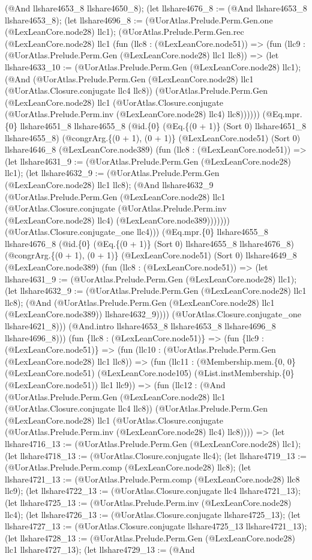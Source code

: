 \documentclass[11pt]{article}
\begin{document}
(@And llshare4653\_8 llshare4650\_8); (let llshare4676\_8 := (@And llshare4653\_8 llshare4653\_8); (let llshare4696\_8 := (@UorAtlas.Prelude.Perm.Gen.one (@LexLeanCore.node28) llc1); (@UorAtlas.Prelude.Perm.Gen.rec (@LexLeanCore.node28) llc1 (fun (llc8 : (@LexLeanCore.node51)) => (fun (llc9 : (@UorAtlas.Prelude.Perm.Gen (@LexLeanCore.node28) llc1 llc8)) => (let llshare4633\_10 := (@UorAtlas.Prelude.Perm.Gen (@LexLeanCore.node28) llc1); (@And (@UorAtlas.Prelude.Perm.Gen (@LexLeanCore.node28) llc1 (@UorAtlas.Closure.conjugate llc4 llc8)) (@UorAtlas.Prelude.Perm.Gen (@LexLeanCore.node28) llc1 (@UorAtlas.Closure.conjugate (@UorAtlas.Prelude.Perm.inv (@LexLeanCore.node28) llc4) llc8)))))) (@Eq.mpr.\{0\} llshare4651\_8 llshare4655\_8 (@id.\{0\} (@Eq.\{(0 + 1)\} (Sort 0) llshare4651\_8 llshare4655\_8) (@congrArg.\{(0 + 1), (0 + 1)\} (@LexLeanCore.node51) (Sort 0) llshare4646\_8 (@LexLeanCore.node389) (fun (llc8 : (@LexLeanCore.node51)) => (let llshare4631\_9 := (@UorAtlas.Prelude.Perm.Gen (@LexLeanCore.node28) llc1); (let llshare4632\_9 := (@UorAtlas.Prelude.Perm.Gen (@LexLeanCore.node28) llc1 llc8); (@And llshare4632\_9 (@UorAtlas.Prelude.Perm.Gen (@LexLeanCore.node28) llc1 (@UorAtlas.Closure.conjugate (@UorAtlas.Prelude.Perm.inv (@LexLeanCore.node28) llc4) (@LexLeanCore.node389))))))) (@UorAtlas.Closure.conjugate\_one llc4))) (@Eq.mpr.\{0\} llshare4655\_8 llshare4676\_8 (@id.\{0\} (@Eq.\{(0 + 1)\} (Sort 0) llshare4655\_8 llshare4676\_8) (@congrArg.\{(0 + 1), (0 + 1)\} (@LexLeanCore.node51) (Sort 0) llshare4649\_8 (@LexLeanCore.node389) (fun (llc8 : (@LexLeanCore.node51)) => (let llshare4631\_9 := (@UorAtlas.Prelude.Perm.Gen (@LexLeanCore.node28) llc1); (let llshare4632\_9 := (@UorAtlas.Prelude.Perm.Gen (@LexLeanCore.node28) llc1 llc8); (@And (@UorAtlas.Prelude.Perm.Gen (@LexLeanCore.node28) llc1 (@LexLeanCore.node389)) llshare4632\_9)))) (@UorAtlas.Closure.conjugate\_one llshare4621\_8))) (@And.intro llshare4653\_8 llshare4653\_8 llshare4696\_8 llshare4696\_8))) (fun \{llc8 : (@LexLeanCore.node51)\} => (fun \{llc9 : (@LexLeanCore.node51)\} => (fun (llc10 : (@UorAtlas.Prelude.Perm.Gen (@LexLeanCore.node28) llc1 llc8)) => (fun (llc11 : (@Membership.mem.\{0, 0\} (@LexLeanCore.node51) (@LexLeanCore.node105) (@List.instMembership.\{0\} (@LexLeanCore.node51)) llc1 llc9)) => (fun (llc12 : (@And (@UorAtlas.Prelude.Perm.Gen (@LexLeanCore.node28) llc1 (@UorAtlas.Closure.conjugate llc4 llc8)) (@UorAtlas.Prelude.Perm.Gen (@LexLeanCore.node28) llc1 (@UorAtlas.Closure.conjugate (@UorAtlas.Prelude.Perm.inv (@LexLeanCore.node28) llc4) llc8)))) => (let llshare4716\_13 := (@UorAtlas.Prelude.Perm.Gen (@LexLeanCore.node28) llc1); (let llshare4718\_13 := (@UorAtlas.Closure.conjugate llc4); (let llshare4719\_13 := (@UorAtlas.Prelude.Perm.comp (@LexLeanCore.node28) llc8); (let llshare4721\_13 := (@UorAtlas.Prelude.Perm.comp (@LexLeanCore.node28) llc8 llc9); (let llshare4722\_13 := (@UorAtlas.Closure.conjugate llc4 llshare4721\_13); (let llshare4725\_13 := (@UorAtlas.Prelude.Perm.inv (@LexLeanCore.node28) llc4); (let llshare4726\_13 := (@UorAtlas.Closure.conjugate llshare4725\_13); (let llshare4727\_13 := (@UorAtlas.Closure.conjugate llshare4725\_13 llshare4721\_13); (let llshare4728\_13 := (@UorAtlas.Prelude.Perm.Gen (@LexLeanCore.node28) llc1 llshare4727\_13); (let llshare4729\_13 := (@And 
\end{document}
